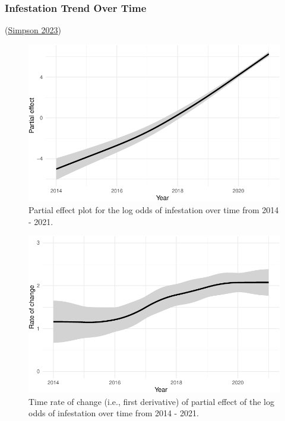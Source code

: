 \documentclass[
  letterpaper,
  DIV=11,
  numbers=noendperiod]{scrartcl}
\begin{document}
\hypertarget{infestation-trend-over-time}{%
\subsubsection{Infestation Trend Over
Time}\label{infestation-trend-over-time}}

(\protect\hyperlink{ref-gratia2023}{Simpson 2023})

\begin{figure}

{\centering \includegraphics{revisions_statistical_analysis_files/figure-pdf/fig-time-1.pdf}

}

\caption{\label{fig-time}Partial effect plot for the log odds of
infestation over time from 2014 - 2021.}

\end{figure}

\begin{figure}

{\centering \includegraphics{revisions_statistical_analysis_files/figure-pdf/fig-time-deriv-1.pdf}

}

\caption{\label{fig-time-deriv}Time rate of change (i.e., first
derivative) of partial effect of the log odds of infestation over time
from 2014 - 2021.}

\end{figure}
\end{document}
